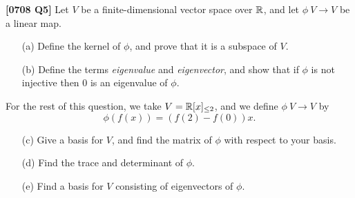 \documentclass[a4paper]{article}
\begin{document}
\begin{problem}\textbf{[0708 Q5]}
 Let $V$ be a finite-dimensional vector space over ${\mathbb{R}}$, and let
 $\phi\:V\to V$ be a linear map.
 \begin{itemize}
  \item[(a)] Define the kernel of $\phi$, and prove that it is a
   subspace of $V$.  
  \item[(b)] Define the terms \emph{eigenvalue} and
   \emph{eigenvector}, and show that if $\phi$ is not injective then
   $0$ is an eigenvalue of $\phi$.  
 \end{itemize}
 For the rest of this question, we take $V={\mathbb{R}}[x]_{\leq 2}$, and we
 define $\phi\:V\to V$ by 
 \[ \phi(f(x))=(f(2)-f(0))x. \]
 \begin{itemize}
  \item[(c)] Give a basis for $V$, and find the matrix of $\phi$ with
   respect to your basis.  
  \item[(d)] Find the trace and determinant of $\phi$.  
  \item[(e)] Find a basis for $V$ consisting of eigenvectors of
   $\phi$. 
 \end{itemize}
\end{problem}
\end{document}
